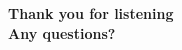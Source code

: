 \documentclass[xcolor=pdftex,dvipsnames,table]{beamer}
\begin{document}
\begin{frame}

    \date[] {}

    \begin{center}
        \textbf{Thank you for listening\\Any questions?\\}
        \titlepage
    \end{center}
\end{frame}

\end{document}
